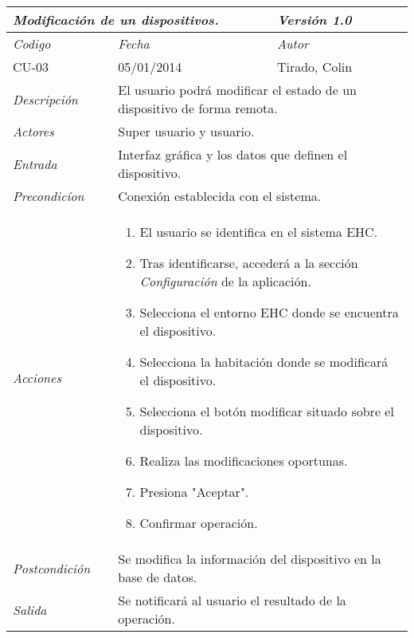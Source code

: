 \begin{center}
    \begin{tabular}{|p{3cm}|p{4cm}|p{4cm}|p{4cm}|}
    \hline \multicolumn{3}{|p{9cm}|}{\textit{Modificaci\'on de un dispositivos.}} & \textit{Versi\'on 1.0} \\
	\hline \textit{Codigo} & \textit{Fecha} & \multicolumn{2}{|p{6cm}|}{\textit{Autor}} \\
	CU-03 & 05/01/2014 & \multicolumn{2}{|p{6cm}|}{Tirado, Colin} \\		
    \hline \textit{Descripci\'on} & \multicolumn{3}{|p{9cm}|}{El usuario podr\'a modificar el estado de un dispositivo de forma remota.} \\
    \hline \textit{Actores} & \multicolumn{3}{|p{9cm}|}{Super usuario y usuario.} \\
    \hline \textit{Entrada} & \multicolumn{3}{|p{9cm}|}{Interfaz gr\'afica y los datos que definen el dispositivo.} \\
    \hline \textit{Precondic\'ion} & \multicolumn{3}{|p{9cm}|}{Conexi\'on establecida con el sistema.} \\
    \hline \textit{Acciones} & \multicolumn{3}{|p{9cm}|}{
        \begin{enumerate}
        \item El usuario se identifica en el sistema EHC.
        \item Tras identificarse, acceder\'a a la secci\'on \textit{Configuraci\'on} de la aplicaci\'on.
        \item Selecciona el entorno EHC donde se encuentra el dispositivo.
        \item Selecciona la habitaci\'on donde se modificar\'a el dispositivo.
        \item Selecciona el bot\'on modificar situado sobre el dispositivo.
        \item Realiza las modificaciones oportunas.
        \item Presiona "Aceptar".
        \item Confirmar operaci\'on.
        \end{enumerate}
           } \\
    \hline \textit{Postcondici\'on} & \multicolumn{3}{|p{9cm}|}{Se modifica la informaci\'on del dispositivo en la base de datos.} \\
    \hline \textit{Salida} & \multicolumn{3}{|p{9cm}|}{Se notificar\'a al usuario el resultado de la operaci\'on.} \\ \hline
    \end{tabular}
\end{center}